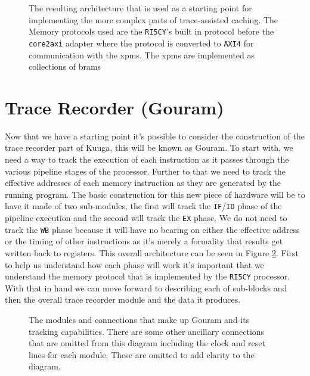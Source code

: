 \begin{figure}[htbp]
	
	\caption[The Basic Implemented Architecture]{The resulting architecture that is used as a starting point for implementing the more complex parts of trace-assisted caching. The Memory protocols used are the \texttt{RI5CY}'s built in protocol before the \texttt{core2axi} adapter where the protocol is converted to \texttt{AXI4} for communication with the \glspl{xpm}. The \glspl{xpm} are implemented as collections of \glspl{bram}}
	\label{fig:kuuga-architecture}
\end{figure}

\section{Trace Recorder (Gouram)}

Now that we have a starting point it's possible to consider the construction of the trace recorder part of Kuuga, this will be known as Gouram. To start with, we need a way to track the execution of each instruction as it passes through the various pipeline stages of the processor. Further to that we need to track the effective addresses of each memory instruction as they are generated by the running program. The basic construction for this new piece of hardware will be to have it made of two sub-modules, the first will track the \texttt{IF}/\texttt{ID} phase of the pipeline execution and the second will track the \texttt{EX} phase. We do not need to track the \texttt{WB} phase because it will have no bearing on either the effective address or the timing of other instructions as it's merely a formality that results get written back to registers. This overall architecture can be seen in Figure \ref{fig:gouram-architecture}. First to help us understand how each phase will work it's important that we understand the memory protocol that is implemented by the \texttt{RI5CY} processor. With that in hand we can move forward to describing each of sub-blocks and then the overall trace recorder module and the data it produces.

\begin{figure}
	
	\caption[Gouram High Level Architecture]{The modules and connections that make up Gouram and its tracking capabilities. There are some other ancillary connections that are omitted from this diagram including the clock and reset lines for each module. These are omitted to add clarity to the diagram.}
	\label{fig:gouram-architecture}
\end{figure}

